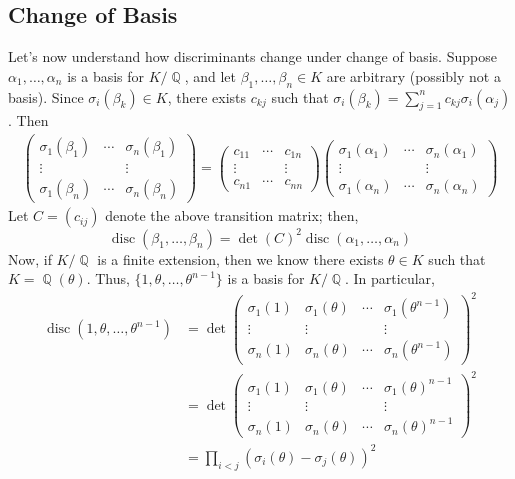 \documentclass[11pt, a4paper]{memoir}
\DeclareMathOperator{\Q}{{\mathbb{Q}}}
\theoremstyle{change}
\theoremstyle{plain}
\theoremstyle{nonumberplain}
\DeclareMathOperator{\disc}{disc}
\begin{document}
\subsection{Change of Basis}
Let's now understand how discriminants change under change of basis.
Suppose $\alpha_1,\ldots,\alpha_n$ is a basis for $K/\Q$, and let $\beta_1,\ldots,\beta_n\in K$ are arbitrary (possibly not a basis).
Since $\sigma_i(\beta_k)\in K$, there exists $c_{kj}$ such that $\sigma_i(\beta_k)=\sum_{j=1}^n c_{kj}\sigma_i(\alpha_j)$.
Then
\begin{align*}
    \begin{pmatrix}
        \sigma_1(\beta_1) &\cdots&\sigma_n(\beta_1)\\
        \vdots&&\vdots\\
        \sigma_1(\beta_n)&\cdots&\sigma_n(\beta_n)
    \end{pmatrix}
    =
    \begin{pmatrix}
        c_{11} &\cdots&c_{1n}\\
        \vdots&&\vdots\\
        c_{n1}&\cdots&c_{nn}
    \end{pmatrix}
    \begin{pmatrix}
        \sigma_1(\alpha_1) &\cdots&\sigma_n(\alpha_1)\\
        \vdots&&\vdots\\
        \sigma_1(\alpha_n)&\cdots&\sigma_n(\alpha_n)
    \end{pmatrix}
\end{align*}
Let $C=\left(c_{ij}\right)$ denote the above transition matrix; then,
\begin{equation*}
    \disc(\beta_1,\ldots,\beta_n)=\det(C)^2\disc(\alpha_1,\ldots,\alpha_n)
\end{equation*}
Now, if $K/\Q$ is a finite extension, then we know there exists $\theta\in K$ such that $K=\Q(\theta)$.
Thus, $\{1,\theta,\ldots,\theta^{n-1}\}$ is a basis for $K/\Q$.
In particular,
\begin{align*}
    \disc(1,\theta,\ldots,\theta^{n-1}) &= \det\begin{pmatrix}\sigma_1(1) &\sigma_1(\theta)&\cdots&\sigma_1(\theta^{n-1})\\\vdots&\vdots&&\vdots\\\sigma_n(1)&\sigma_n(\theta)&\cdots&\sigma_n(\theta^{n-1})\end{pmatrix}^2\\
                                        &=\det\begin{pmatrix}\sigma_1(1) &\sigma_1(\theta)&\cdots&\sigma_1(\theta)^{n-1}\\\vdots&\vdots&&\vdots\\\sigma_n(1)&\sigma_n(\theta)&\cdots&\sigma_n(\theta)^{n-1}\end{pmatrix}^2\\
                                        &= \prod_{i<j}(\sigma_i(\theta)-\sigma_j(\theta))^2
\end{align*}
\end{document}
